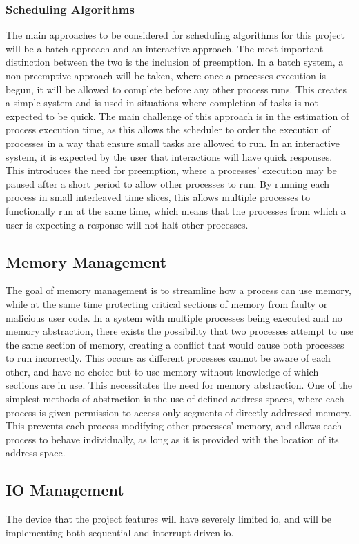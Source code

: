 \subsubsection{Scheduling Algorithms}
The main approaches to be considered for scheduling algorithms for this project will be a batch approach and an interactive approach. The most important distinction between the two is the inclusion of preemption. In a batch system, a non-preemptive approach will be taken, where once a processes execution is begun, it will be allowed to complete before any other process runs. This creates a simple system and is used in situations where completion of tasks is not expected to be quick. The main challenge of this approach is in the estimation of process execution time, as this allows the scheduler to order the execution of processes in a way that ensure small tasks are allowed to run. In an interactive system, it is expected by the user that interactions will have quick responses. This introduces the need for preemption, where a processes' execution may be paused after a short period to allow other processes to run. By running each process in small interleaved time slices, this allows multiple processes to functionally run at the same time, which means that the processes from which a user is expecting a response will not halt other processes\cite{modern_operating}.
\subsection{Memory Management}
The goal of memory management is to streamline how a process can use memory, while at the same time protecting critical sections of memory from faulty or malicious user code. In a system with multiple processes being executed and no memory abstraction, there exists the possibility that two processes attempt to use the same section of memory, creating a conflict that would cause both processes to run incorrectly. This occurs as different processes cannot be aware of each other, and have no choice but to use memory without knowledge of which sections are in use. This necessitates the need for memory abstraction. One of the simplest methods of abstraction is the use of defined address spaces, where each process is given permission to access only segments of directly addressed memory. This prevents each process modifying other processes' memory, and allows each process to behave individually, as long as it is provided with the location of its address space\cite{modern_operating}.
\subsection{IO Management}
The device that the project features will have severely limited \ac{io}, and will be implementing both sequential and interrupt driven \ac{io}. 
